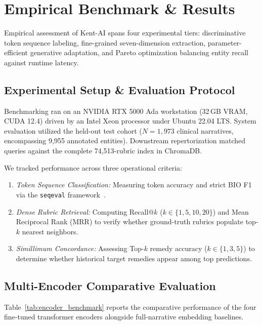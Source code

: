 \section{Empirical Benchmark \& Results}
\label{sec:results}

Empirical assessment of Kent-AI spans four experimental tiers: discriminative token sequence labeling, fine-grained seven-dimension extraction, parameter-efficient generative adaptation, and Pareto optimization balancing entity recall against runtime latency.

\subsection{Experimental Setup \& Evaluation Protocol}

Benchmarking ran on an NVIDIA RTX 5000 Ada workstation (32\,GB VRAM, CUDA 12.4) driven by an Intel Xeon processor under Ubuntu 22.04 LTS. System evaluation utilized the held-out test cohort ($N = 1,973$ clinical narratives, encompassing 9,955 annotated entities). Downstream repertorization matched queries against the complete 74,513-rubric index in ChromaDB.

We tracked performance across three operational criteria:
\begin{enumerate}
    \item \textit{Token Sequence Classification:} Measuring token accuracy and strict BIO F1 via the \texttt{seqeval} framework~\cite{seqeval2018}.
    \item \textit{Dense Rubric Retrieval:} Computing Recall@$k$ ($k \in \{1, 5, 10, 20\}$) and Mean Reciprocal Rank (MRR) to verify whether ground-truth rubrics populate top-$k$ nearest neighbors.
    \item \textit{Simillimum Concordance:} Assessing Top-$k$ remedy accuracy ($k \in \{1, 3, 5\}$) to determine whether historical target remedies appear among top predictions.
\end{enumerate}

\subsection{Multi-Encoder Comparative Evaluation}

Table~\ref{tab:encoder_benchmark} reports the comparative performance of the four fine-tuned transformer encoders alongside full-narrative embedding baselines.

